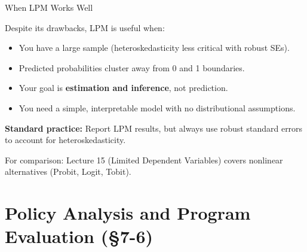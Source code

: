\documentclass[aspectratio=169, 12pt]{beamer}
\begin{document}
\begin{frame}[shrink=20]{When LPM Works Well}

  Despite its drawbacks, LPM is useful when:

  \medskip

  \begin{highlightbox}
    \begin{itemize}
      \item You have a large sample (heteroskedasticity less critical with robust SEs).
      \item Predicted probabilities cluster away from 0 and 1 boundaries.
      \item Your goal is \textbf{estimation and inference}, not prediction.
      \item You need a simple, interpretable model with no distributional assumptions.
    \end{itemize}
  \end{highlightbox}

  \medskip

  \begin{keybox}
    \textbf{Standard practice:} Report LPM results, but always use robust standard errors to account for heteroskedasticity.

    For comparison: Lecture 15 (Limited Dependent Variables) covers nonlinear alternatives (Probit, Logit, Tobit).
  \end{keybox}

\end{frame}

\section{Policy Analysis and Program Evaluation (\S7-6)}
\end{document}
